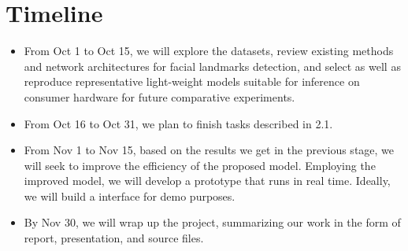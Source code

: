 \documentclass[12pt]{article}
\begin{document}
\section{Timeline}

\begin{itemize}
\item From Oct 1 to Oct 15, we will explore the datasets, review existing methods and network architectures for facial landmarks detection, and select as well as reproduce representative light-weight models suitable for inference on consumer hardware for future comparative experiments.
\item From Oct 16 to Oct 31, we plan to finish tasks described in 2.1.
\item From Nov 1 to Nov 15, based on the results we get in the previous stage, we will seek to improve the efficiency of the proposed model. Employing the improved model, we will develop a prototype that runs in real time. Ideally, we will build a interface for demo purposes.
\item By Nov 30, we will wrap up the project, summarizing our work in the form of report, presentation, and source files.
\end{itemize}

 

\end{document}

